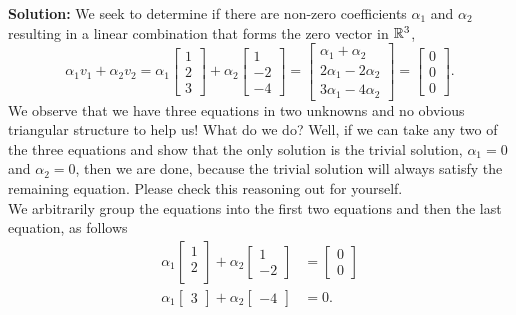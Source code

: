 \textbf{Solution:} We seek to determine if there are non-zero coefficients $\alpha_1$ and $\alpha_2$ resulting in a linear combination that forms the zero vector in $\mathbb R^3$,
\begin{equation}
\label{eq:LinearIndependenceExample00a}
    \alpha_1 v_1 + \alpha_2 v_2  = 
    \alpha_1 \left[ \begin{array}{r} 1 \\2\\  3  \end{array} \right] 
+ \alpha_2 \left[ \begin{array}{r}  1 \\ -2  \\-4  \end{array} \right] =  \left[ \begin{array}{r} \alpha_1 + \alpha_2\\ 2 \alpha_1 -2  \alpha_2 \\ 3 \alpha_1 -4 \alpha_2 \end{array} \right] = \left[ \begin{array}{r} 0 \\ 0 \\0\end{array} \right].
\end{equation}
We observe that we have three equations in two unknowns and no obvious triangular structure to help us! What do we do? Well, if we can take any two of the three equations and show that the only solution is the trivial solution,  $\alpha_1=0$ and $\alpha_2=0$, then we are done, because the trivial solution will always satisfy the remaining equation. Please check this reasoning out for yourself.\\

We arbitrarily group the equations into the first two equations and then the last equation, as follows 
\begin{align}
\label{eq:LinearIndependenceExample00b1}
    \alpha_1 \left[ \begin{array}{r} 1 \\2\\ \end{array} \right] 
+ \alpha_2 \left[ \begin{array}{r}  1 \\ -2   \end{array} \right] &= \left[ \begin{array}{r} 0 \\ 0 \end{array} \right] \\
\label{eq:LinearIndependenceExample00b2}
\alpha_1 \left[ \begin{array}{r} 3 \end{array} \right] + \alpha_2 \left[ \begin{array}{r} -4\end{array} \right] &= 0.
\end{align}

